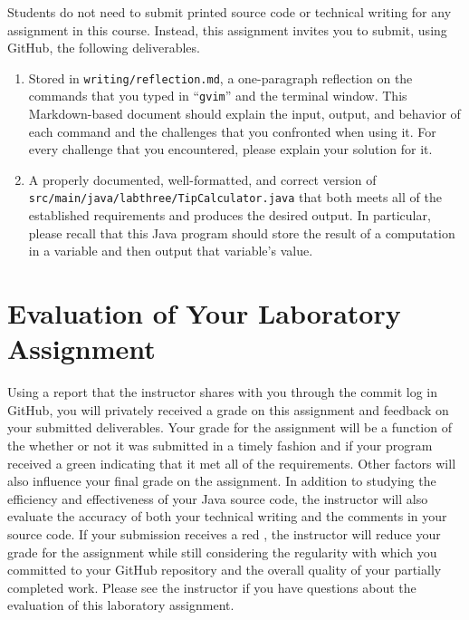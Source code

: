 \documentclass[11pt]{article}
\newcommand{\mainprogramsource}{\lstinline{src/main/java/labthree/TipCalculator.java}}
\newcommand{\reflection}{\lstinline{writing/reflection.md}}
\newcommand{\command}[1]{``\lstinline{#1}''}
\newcommand{\checkmark}{\ding{51}}
\newcommand{\naughtmark}{\ding{55}}
\begin{document}
\noindent Students do not need to submit printed source code or technical writing for any assignment in this course.
Instead, this assignment invites you to submit, using GitHub, the following deliverables.

\begin{enumerate}

\setlength{\itemsep}{0in}

\item Stored in \reflection{}, a one-paragraph reflection on the commands that you typed in \command{gvim} and the
  terminal window. This Markdown-based document should explain the input, output, and behavior of each command and the
  challenges that you confronted when using it. For every challenge that you encountered, please explain your solution
  for it.

\item A properly documented, well-formatted, and correct version of \mainprogramsource{} that both meets all of the
  established requirements and produces the desired output. In particular, please recall that this Java program should
  store the result of a computation in a variable and then output that variable's value.

\end{enumerate}

\section*{Evaluation of Your Laboratory Assignment}

Using a report that the instructor shares with you through the commit log in GitHub, you will privately received a grade
on this assignment and feedback on your submitted deliverables. Your grade for the assignment will be a function of the
whether or not it was submitted in a timely fashion and if your program received a green \checkmark{} indicating that it
met all of the requirements. Other factors will also influence your final grade on the assignment. In addition to
studying the efficiency and effectiveness of your Java source code, the instructor will also evaluate the accuracy of
both your technical writing and the comments in your source code. If your submission receives a red \naughtmark{}, the
instructor will reduce your grade for the assignment while still considering the regularity with which you committed to
your GitHub repository and the overall quality of your partially completed work. Please see the instructor if you have
questions about the evaluation of this laboratory assignment.
\end{document}
